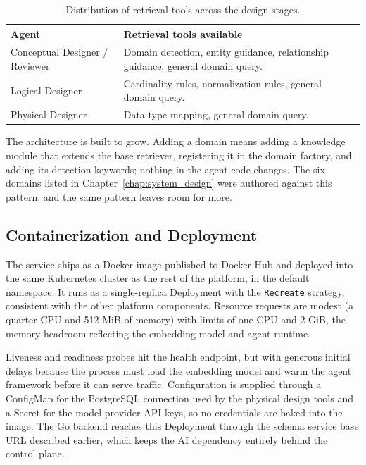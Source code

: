 \begin{table}[H]
    \centering
    \small
    \renewcommand{\arraystretch}{1.3}
    \begin{tabularx}{\textwidth}{|>{\RaggedRight\arraybackslash}p{3.8cm}|>{\RaggedRight\arraybackslash}X|}
    \hline
    \textbf{Agent} & \textbf{Retrieval tools available} \\
    \hline
    Conceptual Designer / Reviewer & Domain detection, entity guidance, relationship guidance, general domain query. \\
    \hline
    Logical Designer & Cardinality rules, normalization rules, general domain query. \\
    \hline
    Physical Designer & Data-type mapping, general domain query. \\
    \hline
    \end{tabularx}
    \caption{Distribution of retrieval tools across the design stages.}
    \label{tab:rag_tool_dist}
\end{table}

The architecture is built to grow. Adding a domain means adding a knowledge module that extends the base retriever, registering it in the domain factory, and adding its detection keywords; nothing in the agent code changes. The six domains listed in Chapter~\ref{chap:system_design} were authored against this pattern, and the same pattern leaves room for more.

\subsection{Containerization and Deployment}

The service ships as a Docker image published to Docker Hub and deployed into the same Kubernetes cluster as the rest of the platform, in the default namespace. It runs as a single-replica Deployment with the \texttt{Recreate} strategy, consistent with the other platform components. Resource requests are modest (a quarter CPU and 512 MiB of memory) with limits of one CPU and 2 GiB, the memory headroom reflecting the embedding model and agent runtime.

Liveness and readiness probes hit the health endpoint, but with generous initial delays because the process must load the embedding model and warm the agent framework before it can serve traffic. Configuration is supplied through a ConfigMap for the PostgreSQL connection used by the physical design tools and a Secret for the model provider API keys, so no credentials are baked into the image. The Go backend reaches this Deployment through the schema service base URL described earlier, which keeps the AI dependency entirely behind the control plane.

